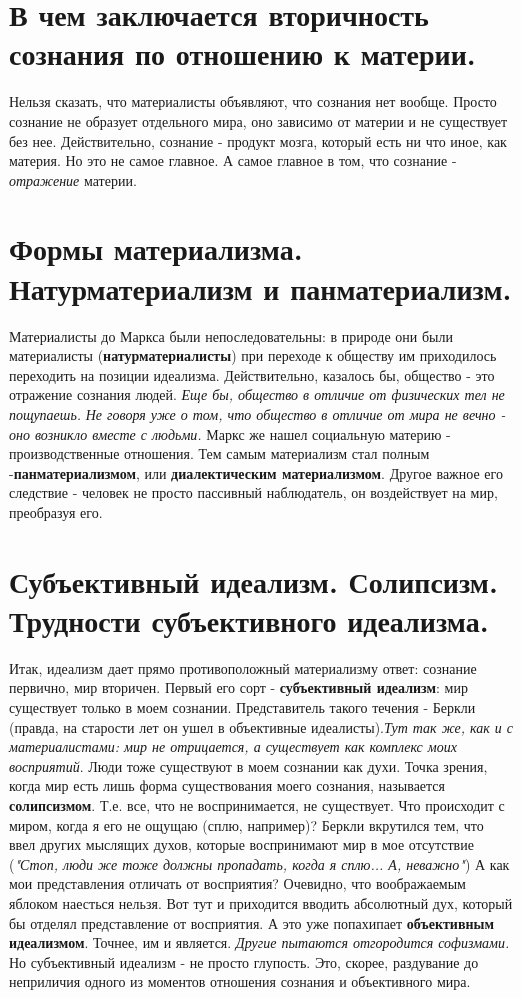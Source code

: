 \section{В чем заключается вторичность сознания по отношению к материи.}
Нельзя сказать, что материалисты объявляют, что сознания нет вообще. Просто сознание не образует отдельного мира, оно зависимо от материи и не существует без нее. Действительно, сознание - продукт мозга, который есть ни что иное, как материя. Но это не самое главное. А самое главное в том, что сознание - \textsl{отражение} материи.

\section{Формы материализма. Натурматериализм и панматериализм.}
Материалисты до Маркса были непоследовательны: в природе они были материалисты (\textbf{натурматериалисты}) при переходе к обществу им приходилось переходить на позиции идеализма. Действительно, казалось бы, общество - это отражение сознания людей. 
\textit{Еще бы, общество в отличие от физических тел не пощупаешь.}
\textit{Не говоря уже о том, что общество в отличие от мира не вечно - оно возникло вместе с людьми.} Маркс же нашел социальную материю - производственные отношения. Тем самым материализм стал полным -\textbf{панматериализмом}, или \textbf{диалектическим материализмом}. Другое важное его следствие - человек не просто пассивный наблюдатель, он воздействует на мир, преобразуя его.

\section{Субъективный идеализм. Солипсизм. Трудности субъективного идеализма.}
Итак, идеализм дает прямо противоположный материализму ответ: сознание первично, мир вторичен.  Первый его сорт - \textbf{субъективный идеализм}: мир существует только в моем сознании. Представитель такого течения - Беркли (правда, на старости лет он ушел в объективные идеалисты).\textit{Тут так же, как и с материалистами: мир не отрицается, а существует как комплекс моих восприятий}. Люди тоже существуют в моем сознании как духи.
Точка зрения, когда мир есть лишь форма существования моего сознания, называется \textbf{солипсизмом}. Т.е. все, что не воспринимается, не существует. Что происходит с миром, когда я его не ощущаю (сплю, например)? Беркли вкрутился тем, что ввел других мыслящих духов, которые воспринимают мир в мое отсутствие (\textit{"Стоп, люди же тоже должны пропадать, когда я сплю... А, неважно"}) А как мои представления отличать от восприятия? Очевидно, что воображаемым яблоком наесться нельзя. Вот тут и приходится вводить абсолютный дух, который бы отделял представление от восприятия. А это уже попахипает \textbf{объективным идеализмом}. Точнее, им и является. \textit{Другие пытаются отгородится софизмами.} Но субъективный идеализм - не просто глупость. Это, скорее, раздувание до неприличия одного из моментов отношения сознания и объективного мира.

